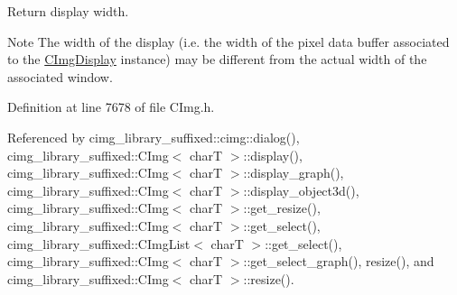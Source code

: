 Return display width. 

\begin{DoxyNote}{Note}
The width of the display (i.\+e. the width of the pixel data buffer associated to the \hyperlink{structcimg__library__suffixed_1_1CImgDisplay}{C\+Img\+Display} instance) may be different from the actual width of the associated window. 
\end{DoxyNote}


Definition at line 7678 of file C\+Img.\+h.



Referenced by cimg\+\_\+library\+\_\+suffixed\+::cimg\+::dialog(), cimg\+\_\+library\+\_\+suffixed\+::\+C\+Img$<$ char\+T $>$\+::display(), cimg\+\_\+library\+\_\+suffixed\+::\+C\+Img$<$ char\+T $>$\+::display\+\_\+graph(), cimg\+\_\+library\+\_\+suffixed\+::\+C\+Img$<$ char\+T $>$\+::display\+\_\+object3d(), cimg\+\_\+library\+\_\+suffixed\+::\+C\+Img$<$ char\+T $>$\+::get\+\_\+resize(), cimg\+\_\+library\+\_\+suffixed\+::\+C\+Img$<$ char\+T $>$\+::get\+\_\+select(), cimg\+\_\+library\+\_\+suffixed\+::\+C\+Img\+List$<$ char\+T $>$\+::get\+\_\+select(), cimg\+\_\+library\+\_\+suffixed\+::\+C\+Img$<$ char\+T $>$\+::get\+\_\+select\+\_\+graph(), resize(), and cimg\+\_\+library\+\_\+suffixed\+::\+C\+Img$<$ char\+T $>$\+::resize().

